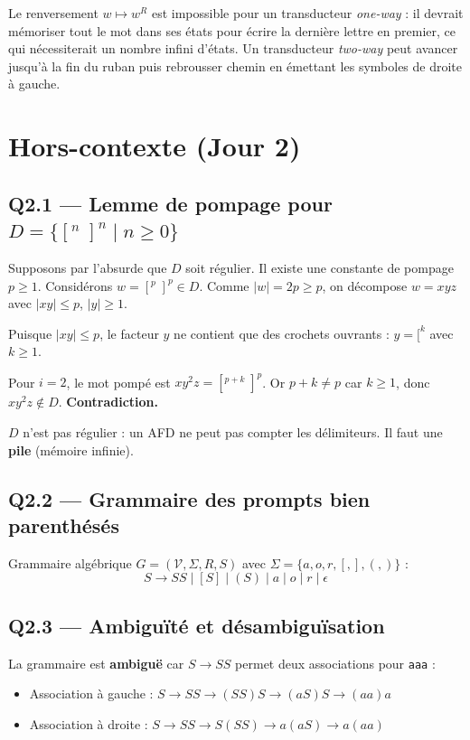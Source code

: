 \documentclass[12pt,a4paper,oneside]{scrartcl}
\begin{document}
Le renversement $w \mapsto w^R$ est impossible pour un transducteur \textit{one-way} : il devrait mémoriser tout le mot dans ses états pour écrire la dernière lettre en premier, ce qui nécessiterait un nombre infini d'états. Un transducteur \textit{two-way} peut avancer jusqu'à la fin du ruban puis rebrousser chemin en émettant les symboles de droite à gauche.

\newpage

\section{Hors-contexte (Jour 2)}

\subsection{Q2.1 — Lemme de pompage pour $D = \{[^n\;]^n \mid n \ge 0\}$}

Supposons par l'absurde que $D$ soit régulier. Il existe une constante de pompage $p \ge 1$.
Considérons $w = [^p\;]^p \in D$. Comme $|w| = 2p \ge p$, on décompose $w = xyz$ avec $|xy| \le p$, $|y| \ge 1$.

Puisque $|xy| \le p$, le facteur $y$ ne contient que des crochets ouvrants : $y = [^k$ avec $k \ge 1$.

Pour $i = 2$, le mot pompé est $xy^2z = [^{p+k}\;]^p$. Or $p + k \neq p$ car $k \ge 1$, donc $xy^2z \notin D$. \textbf{Contradiction.}

$D$ n'est pas régulier : un AFD ne peut pas compter les délimiteurs. Il faut une \textbf{pile} (mémoire infinie).

\subsection{Q2.2 — Grammaire des prompts bien parenthésés}

Grammaire algébrique $G = (\mathcal{V}, \Sigma, R, S)$ avec $\Sigma = \{a, o, r, [, ], (, )\}$ :
$$S \to SS \mid [S] \mid (S) \mid a \mid o \mid r \mid \epsilon$$

\subsection{Q2.3 — Ambiguïté et désambiguïsation}

La grammaire est \textbf{ambiguë} car $S \to SS$ permet deux associations pour \texttt{aaa} :
\begin{itemize}
    \item Association à gauche : $S \to SS \to (SS)S \to (aS)S \to (aa)a$
    \item Association à droite : $S \to SS \to S(SS) \to a(aS) \to a(aa)$
\end{itemize}
\end{document}

